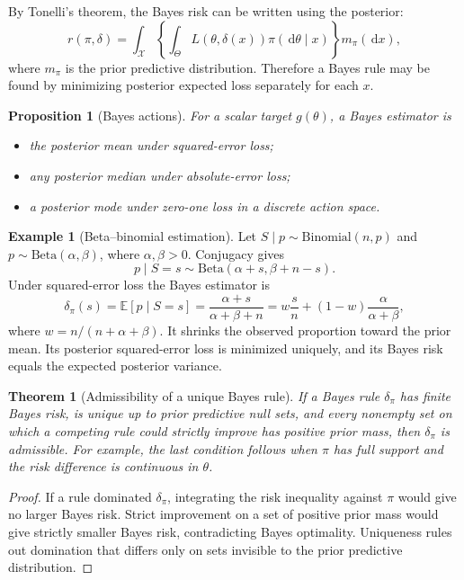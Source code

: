 \documentclass[12pt,oneside]{book}
\numberwithin{equation}{section}
\theoremstyle{definition}
\newtheorem{example}{Example}[section]
\theoremstyle{plain}
\newtheorem{theorem}{Theorem}[section]
\newtheorem{proposition}{Proposition}[section]
\theoremstyle{remark}
\newcommand{\E}{\mathbb{E}}
\newcommand{\dd}{\,\mathrm{d}}
\newcommand{\Bin}{\mathrm{Binomial}}
\newcommand{\BetaDist}{\mathrm{Beta}}
\begin{document}
By Tonelli's theorem, the Bayes risk can be written using the posterior:
\[
 r(\pi,\delta)
 =\int_{\mathcal X}
   \left\{\int_\Theta L(\theta,\delta(x))\pi(\dd\theta\mid x)\right\}
   m_\pi(\dd x),
\]
where $m_\pi$ is the prior predictive distribution.  Therefore a Bayes rule
may be found by minimizing posterior expected loss separately for each $x$.

\begin{proposition}[Bayes actions]
For a scalar target $g(\theta)$, a Bayes estimator is
\begin{itemize}
    \item the posterior mean under squared-error loss;
    \item any posterior median under absolute-error loss;
    \item a posterior mode under zero-one loss in a discrete action space.
\end{itemize}
\end{proposition}

\begin{example}[Beta--binomial estimation]
Let $S\mid p\sim\Bin(n,p)$ and $p\sim\BetaDist(\alpha,\beta)$, where
$\alpha,\beta>0$.  Conjugacy gives
\[
    p\mid S=s\sim\BetaDist(\alpha+s,\beta+n-s).
\]
Under squared-error loss the Bayes estimator is
\begin{equation}
    \delta_\pi(s)=\E[p\mid S=s]
    =\frac{\alpha+s}{\alpha+\beta+n}
    =w\frac{s}{n}+(1-w)\frac{\alpha}{\alpha+\beta},
    \label{eq:beta-binomial-bayes}
\end{equation}
where $w=n/(n+\alpha+\beta)$.  It shrinks the observed proportion toward the
prior mean.  Its posterior squared-error loss is minimized uniquely, and its
Bayes risk equals the expected posterior variance.
\end{example}

\begin{theorem}[Admissibility of a unique Bayes rule]
If a Bayes rule $\delta_\pi$ has finite Bayes risk, is unique up to prior
predictive null sets, and every nonempty set on which a competing rule could
strictly improve has positive prior mass, then $\delta_\pi$ is admissible.
For example, the last condition follows when $\pi$ has full support and the
risk difference is continuous in $\theta$.
\end{theorem}

\begin{proof}
If a rule dominated $\delta_\pi$, integrating the risk inequality against
$\pi$ would give no larger Bayes risk.  Strict improvement on a set of
positive prior mass would give strictly smaller Bayes risk, contradicting
Bayes optimality.  Uniqueness rules out domination that differs only on sets
invisible to the prior predictive distribution.
\end{proof}
\end{document}
